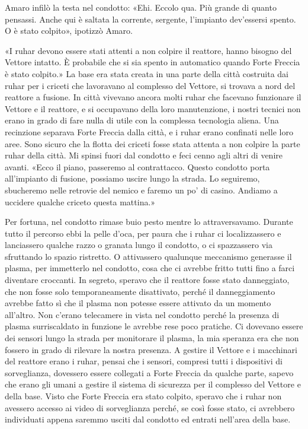Amaro infilò la testa nel condotto: «Ehi. Eccolo qua. Più grande di
quanto pensassi. Anche qui è saltata la corrente, sergente, l'impianto
dev'essersi spento. O è stato colpito», ipotizzò Amaro.

«I ruhar devono essere stati attenti a non colpire il reattore, hanno
bisogno del Vettore intatto. È probabile che si sia spento in automatico
quando Forte Freccia è stato colpito.» La base era stata creata in una
parte della città costruita dai ruhar per i criceti che lavoravano al
complesso del Vettore, si trovava a nord del reattore a fusione. In
città vivevano ancora molti ruhar che facevano funzionare il Vettore e
il reattore, e si occupavano della loro manutenzione, i nostri tecnici
non erano in grado di fare nulla di utile con la complessa tecnologia
aliena. Una recinzione separava Forte Freccia dalla città, e i ruhar
erano confinati nelle loro aree. Sono sicuro che la flotta dei criceti
fosse stata attenta a non colpire la parte ruhar della città. Mi spinsi
fuori dal condotto e feci cenno agli altri di venire avanti. «Ecco il
piano, passeremo al contrattacco. Questo condotto porta all'impianto di
fusione, possiamo uscire lungo la strada. Lo seguiremo, sbucheremo nelle
retrovie del nemico e faremo un po' di casino. Andiamo a uccidere
qualche criceto questa mattina.»

\hfill\break

Per fortuna, nel condotto rimase buio pesto mentre lo attraversavamo.
Durante tutto il percorso ebbi la pelle d'oca, per paura che i ruhar ci
localizzassero e lanciassero qualche razzo o granata lungo il condotto,
o ci spazzassero via sfruttando lo spazio ristretto. O attivassero
qualunque meccanismo generasse il plasma, per immetterlo nel condotto,
cosa che ci avrebbe fritto tutti fino a farci diventare croccanti. In
segreto, speravo che il reattore fosse stato danneggiato, che non fosse
solo temporaneamente disattivato, perché il danneggiamento avrebbe fatto
sì che il plasma non potesse essere attivato da un momento all'altro.
Non c'erano telecamere in vista nel condotto perché la presenza di
plasma surriscaldato in funzione le avrebbe rese poco pratiche. Ci
dovevano essere dei sensori lungo la strada per monitorare il plasma, la
mia speranza era che non fossero in grado di rilevare la nostra
presenza. A gestire il Vettore e i macchinari del reattore erano i
ruhar, pensai che i sensori, compresi tutti i dispositivi di
sorveglianza, dovessero essere collegati a Forte Freccia da qualche
parte, sapevo che erano gli umani a gestire il sistema di sicurezza per
il complesso del Vettore e della base. Visto che Forte Freccia era stato
colpito, speravo che i ruhar non avessero accesso ai video di
sorveglianza perché, se così fosse stato, ci avrebbero individuati
appena saremmo usciti dal condotto ed entrati nell'area della base.

